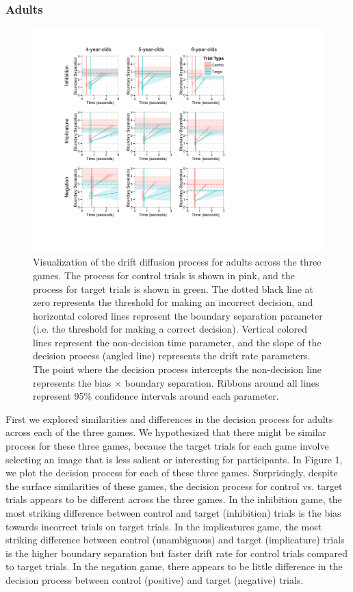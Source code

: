 \documentclass[10pt,letterpaper]{article}
\begin{document}
\subsubsection{Adults}

\begin{figure}
\begin{center} 
\includegraphics[width=6in]{figures/adult_vis.pdf}
\caption{\label{fig:adults} Visualization of the drift diffusion process for adults across the three games.  The process for control trials is shown in pink, and the process for target trials is shown in green.  The dotted black line at zero represents the threshold for making an incorrect decision, and horizontal colored lines represent the boundary separation parameter (i.e. the threshold for making a correct decision).  Vertical colored lines represent the non-decision time parameter, and the slope of the decision process (angled line) represents the drift rate parameters.  The point where the decision process intercepts the non-decision line represents the bias $\times$ boundary separation.  Ribbons around all lines represent 95\% confidence intervals around each parameter.}
\end{center} 
\end{figure}

First we explored similarities and differences in the decision process for adults across each of the three games.  We hypothesized that there might be similar process for these three games, because the target trials for each game involve selecting an image that is less salient or interesting for participants.  In Figure 1, we plot the decision process for each of these three games.  Surprisingly, despite the surface similarities of these games, the decision process for control vs. target trials appears to be different across the three games.  In the inhibition game, the most striking difference between control and target (inhibition) trials is the bias towards incorrect trials on target trials.  In the implicatures game, the most striking difference between control (unambiguous) and target (implicature) trials is the higher boundary separation but faster drift rate for control trials compared to target trials.  In the negation game, there appears to be little difference in the decision process between control (positive) and target (negative) trials.
\end{document}
